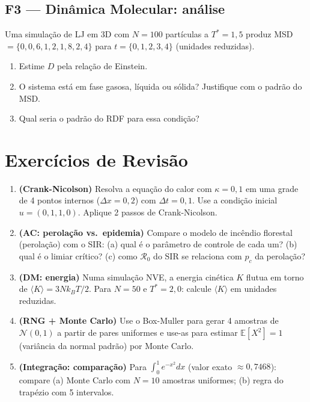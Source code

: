 \documentclass[12pt,a4paper]{article}
\begin{document}
\subsection*{F3 --- Din\^amica Molecular: an\'alise}
Uma simula\c{c}\~ao de LJ em 3D com $N=100$ part\'iculas a $T^*=1{,}5$ produz MSD $= \{0, 0{,}6, 1{,}2, 1{,}8, 2{,}4\}$ para $t = \{0, 1, 2, 3, 4\}$ (unidades reduzidas).
\begin{enumerate}
  \item[$a.$] Estime $D$ pela rela\c{c}\~ao de Einstein.
  \item[$b.$] O sistema est\'a em fase gasosa, l\'iquida ou s\'olida? Justifique com o padr\~ao do MSD.
  \item[$c.$] Qual seria o padr\~ao do RDF para essa condi\c{c}\~ao?
\end{enumerate}

\section*{Exerc\'icios de Revis\~ao}

\begin{enumerate}
  \item \textbf{(Crank-Nicolson)} Resolva a equa\c{c}\~ao do calor com $\kappa=0{,}1$ em uma grade de 4 pontos internos ($\Delta x=0{,}2$) com $\Delta t=0{,}1$. Use a condi\c{c}\~ao inicial $u = (0, 1, 1, 0)$. Aplique 2 passos de Crank-Nicolson.
  
  \item \textbf{(AC: perola\c{c}\~ao vs.\ epidemia)} Compare o modelo de inc\^endio florestal (perola\c{c}\~ao) com o SIR: (a) qual \'e o par\^ametro de controle de cada um? (b) qual \'e o limiar cr\'itico? (c) como $\mathcal{R}_0$ do SIR se relaciona com $p_c$ da perola\c{c}\~ao?
  
  \item \textbf{(DM: energia)} Numa simula\c{c}\~ao NVE, a energia cin\'etica $K$ flutua em torno de $\langle K\rangle = 3Nk_BT/2$. Para $N=50$ e $T^*=2{,}0$: calcule $\langle K\rangle$ em unidades reduzidas.
  
  \item \textbf{(RNG + Monte Carlo)} Use o Box-Muller para gerar 4 amostras de $\mathcal{N}(0,1)$ a partir de pares uniformes e use-as para estimar $\mathbb{E}[X^2] = 1$ (vari\^ancia da normal padr\~ao) por Monte Carlo.
  
  \item \textbf{(Integra\c{c}\~ao: compara\c{c}\~ao)} Para $\int_0^1 e^{-x^2}dx$ (valor exato $\approx 0{,}7468$): compare (a) Monte Carlo com $N=10$ amostras uniformes; (b) regra do trap\'ezio com 5 intervalos.
\end{enumerate}
\end{document}

